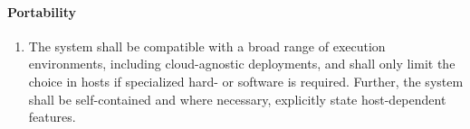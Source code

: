 \paragraph{Portability}
\begin{enumerate}[resume, font=\sffamily, label={\textbf{NFR-\protect\twodigits{\theenumi}}},leftmargin=1.7cm, ref=NFR-\protect\twodigits{\theenumi}]
	\item The system shall be compatible with a broad range of execution environments, including cloud-agnostic deployments, and shall only limit the choice in hosts if specialized hard- or software is required. Further, the system shall be self-contained and where necessary, explicitly state host-dependent features.\label{itm:nfr-portability}
\end{enumerate}
